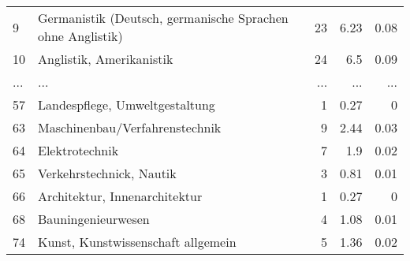 \begin{longtable}{lXrrr}
        9 & \multicolumn{1}{X}{Germanistik (Deutsch, germanische Sprachen ohne Anglistik)} & %
          \num{23} &
          \num[round-mode=places,round-precision=2]{6,23} &
          \num[round-mode=places,round-precision=2]{0,08} \\
        10 & \multicolumn{1}{X}{Anglistik, Amerikanistik} & %
          \num{24} &
          \num[round-mode=places,round-precision=2]{6,5} &
          \num[round-mode=places,round-precision=2]{0,09} \\
       ... & ... & ... & ... & ... \\
        57 & \multicolumn{1}{X}{Landespflege, Umweltgestaltung} & %
          \num{1} &
          \num[round-mode=places,round-precision=2]{0,27} &
          \num[round-mode=places,round-precision=2]{0} \\

        63 & \multicolumn{1}{X}{Maschinenbau/Verfahrenstechnik} & %
          \num{9} &
          \num[round-mode=places,round-precision=2]{2,44} &
          \num[round-mode=places,round-precision=2]{0,03} \\

        64 & \multicolumn{1}{X}{Elektrotechnik} & %
          \num{7} &
          \num[round-mode=places,round-precision=2]{1,9} &
          \num[round-mode=places,round-precision=2]{0,02} \\

        65 & \multicolumn{1}{X}{Verkehrstechnick, Nautik} & %
          \num{3} &
          \num[round-mode=places,round-precision=2]{0,81} &
          \num[round-mode=places,round-precision=2]{0,01} \\

        66 & \multicolumn{1}{X}{Architektur, Innenarchitektur} & %
          \num{1} &
          \num[round-mode=places,round-precision=2]{0,27} &
          \num[round-mode=places,round-precision=2]{0} \\

        68 & \multicolumn{1}{X}{Bauningenieurwesen} & %
          \num{4} &
          \num[round-mode=places,round-precision=2]{1,08} &
          \num[round-mode=places,round-precision=2]{0,01} \\

        74 & \multicolumn{1}{X}{Kunst, Kunstwissenschaft allgemein} & %
          \num{5} &
          \num[round-mode=places,round-precision=2]{1,36} &
          \num[round-mode=places,round-precision=2]{0,02} \\


\end{longtable}
